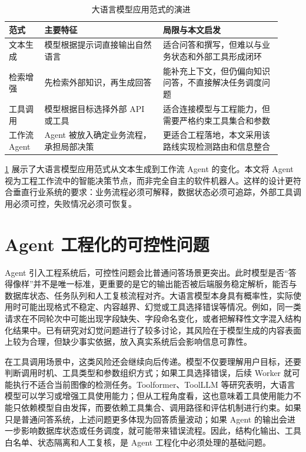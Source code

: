 \begin{table}[!htb]
  \caption{大语言模型应用范式的演进}\label{tab:llm-agent-evolution}
  \centering
  \begin{tabular}{@{}p{0.12\linewidth}p{0.4\linewidth}p{0.4\linewidth}@{}} \toprule
    \textbf{范式} & \textbf{主要特征} & \textbf{局限与本文启发} \\ \midrule
    文本生成 & 模型根据提示词直接输出自然语言 & 适合问答和撰写，但难以与业务状态和外部工具形成闭环 \\
    检索增强 & 先检索外部知识，再生成回答 & 能补充上下文，但仍偏向知识问答，不直接解决任务调度问题 \\
    工具调用 & 模型根据目标选择外部 API 或工具 & 适合连接模型与工程能力，但需要严格约束工具集合和参数 \\
    工作流 Agent & Agent 被放入确定业务流程，承担局部决策 & 更适合工程落地，本文采用该路线实现检测路由和信息整合 \\ \bottomrule
  \end{tabular}
\end{table}

\cref{tab:llm-agent-evolution} 展示了大语言模型应用范式从文本生成到工作流 Agent 的变化。本文将 Agent 视为工程工作流中的智能决策节点，而非完全自主的软件机器人。这样的设计更符合垂直行业系统的要求：业务流程必须可解释，数据状态必须可追踪，外部工具调用必须可控，失败情况必须可恢复。

\section{Agent 工程化的可控性问题}
\label{sec:foundation-agent-engineering-controllability-problem}

Agent 引入工程系统后，可控性问题会比普通问答场景更突出。此时模型是否“答得像样”并不是唯一标准，更重要的是它的输出能否被后端服务稳定解析，能否与数据库状态、任务队列和人工复核流程对齐。大语言模型本身具有概率性，实际使用时可能出现格式不稳定、内容越界、幻觉或工具选择错误等情况。例如，同一类请求在不同轮次中可能出现字段缺失、字段命名变化，或者把解释性文字混入结构化结果中。已有研究对幻觉问题进行了较多讨论，其风险在于模型生成的内容表面上较为合理，但缺少事实依据，放入真实系统后会影响信息可靠性\cite{huang2023hallucination}。

在工具调用场景中，这类风险还会继续向后传递。模型不仅要理解用户目标，还要判断调用时机、工具类型和参数组织方式；如果工具选择错误，后续 Worker 就可能执行不适合当前图像的检测任务。Toolformer、ToolLLM 等研究表明，大语言模型可以学习或增强工具使用能力；但从工程角度看，这也意味着工具使用能力不能只依赖模型自由发挥，而要依赖工具集合、调用路径和评估机制进行约束\cite{schick2023toolformer,qin2023toolllm}。如果只是普通问答系统，上述问题更多体现为回答质量波动；如果 Agent 的输出会进一步影响数据库状态或任务调度，就可能带来错误流程。因此，结构化输出、工具白名单、状态隔离和人工复核，是 Agent 工程化中必须处理的基础问题。

